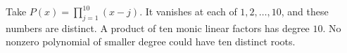 Take $P(x)=\prod_{j=1}^{10}(x-j)$. It vanishes at each of $1,2,\ldots,10$, and these numbers are distinct. A product of ten monic linear factors has degree $\boxed{10}$. No nonzero polynomial of smaller degree could have ten distinct roots.
